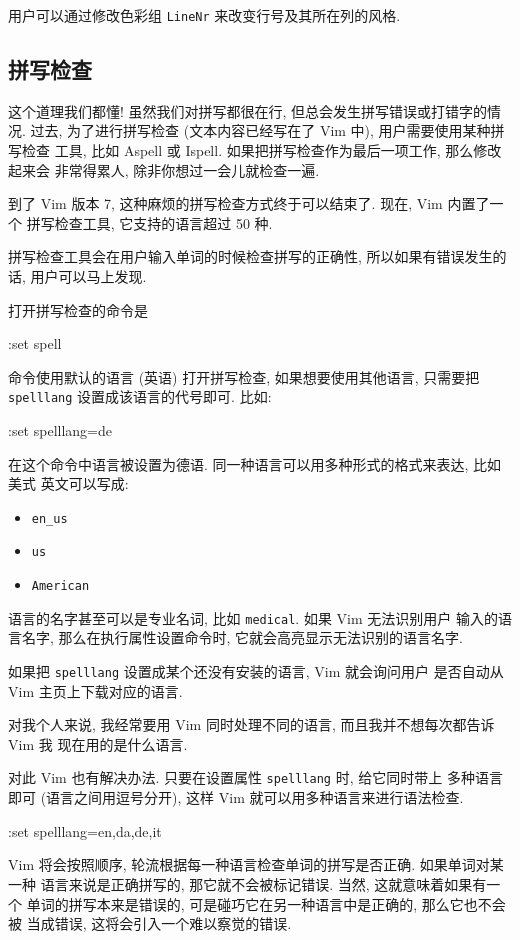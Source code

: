 \begin{warning}
    用户可以通过修改色彩组 \texttt{LineNr} 来改变行号及其所在列的风格.
\end{warning}

\subsection{拼写检查}
\label{subsec:spell_checking_your_language}

这个道理我们都懂! 虽然我们对拼写都很在行, 但总会发生拼写错误或打错字的情况.
过去, 为了进行拼写检查 (文本内容已经写在了 Vim 中), 用户需要使用某种拼写检查
工具, 比如 Aspell 或 Ispell. 如果把拼写检查作为最后一项工作, 那么修改起来会
非常得累人, 除非你想过一会儿就检查一遍.

到了 Vim 版本 7, 这种麻烦的拼写检查方式终于可以结束了. 现在, Vim 内置了一个
拼写检查工具, 它支持的语言超过 50 种.

拼写检查工具会在用户输入单词的时候检查拼写的正确性, 所以如果有错误发生的话,
用户可以马上发现.

打开拼写检查的命令是
\begin{vimcmd}
:set spell
\end{vimcmd}
命令使用默认的语言 (英语) 打开拼写检查, 如果想要使用其他语言, 只需要把 
\texttt{spelllang} 设置成该语言的代号即可. 比如:
\begin{vimcmd}
:set spelllang=de
\end{vimcmd}
在这个命令中语言被设置为德语. 同一种语言可以用多种形式的格式来表达, 比如美式
英文可以写成:
\begin{itemize}
    \item \texttt{en\_us}
    \item \texttt{us}
    \item \texttt{American}
\end{itemize}

语言的名字甚至可以是专业名词, 比如 \texttt{medical}. 如果 Vim 无法识别用户
输入的语言名字, 那么在执行属性设置命令时, 它就会高亮显示无法识别的语言名字.

\begin{warning}
    如果把 \texttt{spelllang} 设置成某个还没有安装的语言, Vim 就会询问用户
    是否自动从 Vim 主页上下载对应的语言.
\end{warning}

对我个人来说, 我经常要用 Vim 同时处理不同的语言, 而且我并不想每次都告诉 Vim 我
现在用的是什么语言.

对此 Vim 也有解决办法. 只要在设置属性 \texttt{spelllang} 时, 给它同时带上
多种语言即可 (语言之间用逗号分开), 这样 Vim 就可以用多种语言来进行语法检查.
\begin{vimcmd}
:set spelllang=en,da,de,it
\end{vimcmd}
Vim 将会按照顺序, 轮流根据每一种语言检查单词的拼写是否正确. 如果单词对某一种
语言来说是正确拼写的, 那它就不会被标记错误. 当然, 这就意味着如果有一个
单词的拼写本来是错误的, 可是碰巧它在另一种语言中是正确的, 那么它也不会被
当成错误, 这将会引入一个难以察觉的错误.


